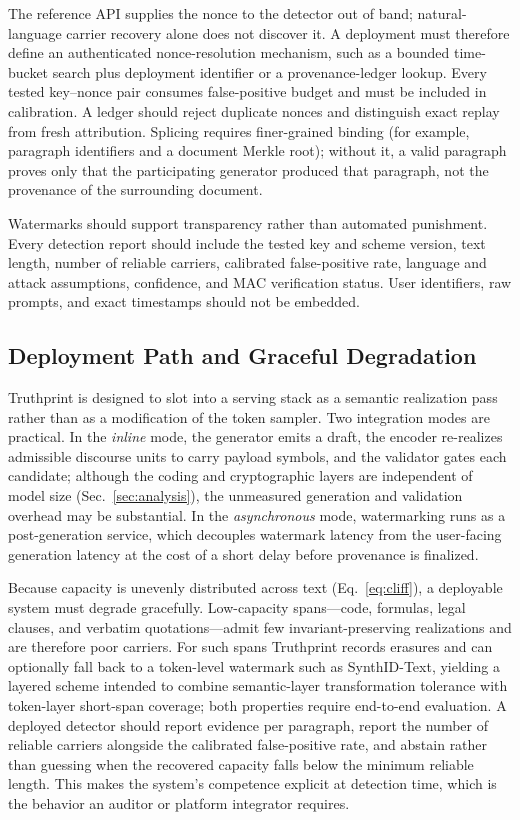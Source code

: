\documentclass[11pt]{article}
\begin{document}
The reference API supplies the nonce to the detector out of band; natural-language carrier recovery alone does not discover it. A deployment must therefore define an authenticated nonce-resolution mechanism, such as a bounded time-bucket search plus deployment identifier or a provenance-ledger lookup. Every tested key--nonce pair consumes false-positive budget and must be included in calibration. A ledger should reject duplicate nonces and distinguish exact replay from fresh attribution. Splicing requires finer-grained binding (for example, paragraph identifiers and a document Merkle root); without it, a valid paragraph proves only that the participating generator produced that paragraph, not the provenance of the surrounding document.

Watermarks should support transparency rather than automated punishment. Every detection report should include the tested key and scheme version, text length, number of reliable carriers, calibrated false-positive rate, language and attack assumptions, confidence, and MAC verification status. User identifiers, raw prompts, and exact timestamps should not be embedded.

\subsection{Deployment Path and Graceful Degradation}
Truthprint is designed to slot into a serving stack as a semantic realization pass rather than as a modification of the token sampler. Two integration modes are practical. In the \emph{inline} mode, the generator emits a draft, the encoder re-realizes admissible discourse units to carry payload symbols, and the validator gates each candidate; although the coding and cryptographic layers are independent of model size (Sec.~\ref{sec:analysis}), the unmeasured generation and validation overhead may be substantial. In the \emph{asynchronous} mode, watermarking runs as a post-generation service, which decouples watermark latency from the user-facing generation latency at the cost of a short delay before provenance is finalized.

Because capacity is unevenly distributed across text (Eq.~\ref{eq:cliff}), a deployable system must degrade gracefully. Low-capacity spans---code, formulas, legal clauses, and verbatim quotations---admit few invariant-preserving realizations and are therefore poor carriers. For such spans Truthprint records erasures and can optionally fall back to a token-level watermark such as SynthID-Text, yielding a layered scheme intended to combine semantic-layer transformation tolerance with token-layer short-span coverage; both properties require end-to-end evaluation. A deployed detector should report evidence per paragraph, report the number of reliable carriers alongside the calibrated false-positive rate, and abstain rather than guessing when the recovered capacity falls below the minimum reliable length. This makes the system's competence explicit at detection time, which is the behavior an auditor or platform integrator requires.
\end{document}
